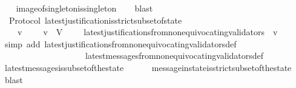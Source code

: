 \begin{isabellebody}
\ \ \isamarkupfalse%
\ image{\isacharunderscore}of{\isacharunderscore}singleton{\isacharunderscore}is{\isacharunderscore}singleton\isanewline
\ \ \isamarkupfalse%
\ blast%
\endisatagproof
{\isafoldproof}%
%
\isadelimproof
\isanewline
%
\endisadelimproof
\isanewline
{}\isamarkupfalse%
\ {\isacharparenleft}\ Protocol{\isacharparenright}\ latest{\isacharunderscore}justification{\isacharunderscore}is{\isacharunderscore}strict{\isacharunderscore}subset{\isacharunderscore}of{\isacharunderscore}state\ {\isacharcolon}\isanewline
\ \ {\isachardoublequoteopen}{\isasymforall}\ {\isasymsigma}\ v{\isachardot}\ {\isasymsigma}\ {\isasymin}\ {\isasymSigma}\ {\isasymand}\ v\ {\isasymin}\ V\ {\isasymlongrightarrow}\ {\isacharparenleft}{\isasymforall}\ {\isasymsigma}{\isacharprime}\ {\isasymin}\ latest{\isacharunderscore}justifications{\isacharunderscore}from{\isacharunderscore}non{\isacharunderscore}equivocating{\isacharunderscore}validators\ {\isasymsigma}\ v{\isachardot}\ {\isasymsigma}{\isacharprime}\ {\isasymsubset}\ {\isasymsigma}{\isacharparenright}{\isachardoublequoteclose}\isanewline
%
\isadelimproof
\ \ %
\endisadelimproof
%
\isatagproof
{}\isamarkupfalse%
\ {\isacharparenleft}simp\ add{\isacharcolon}\ latest{\isacharunderscore}justifications{\isacharunderscore}from{\isacharunderscore}non{\isacharunderscore}equivocating{\isacharunderscore}validators{\isacharunderscore}def\isanewline
\ \ \ \ \ \ \ \ \ \ \ \ \ \ \ \ \ \ \ \ latest{\isacharunderscore}messages{\isacharunderscore}from{\isacharunderscore}non{\isacharunderscore}equivocating{\isacharunderscore}validators{\isacharunderscore}def{\isacharparenright}\isanewline
\ \ \isamarkupfalse%
\ latest{\isacharunderscore}messages{\isacharunderscore}is{\isacharunderscore}subset{\isacharunderscore}of{\isacharunderscore}the{\isacharunderscore}state\isanewline
\ \ \ \ \ \ message{\isacharunderscore}in{\isacharunderscore}state{\isacharunderscore}is{\isacharunderscore}strict{\isacharunderscore}subset{\isacharunderscore}of{\isacharunderscore}the{\isacharunderscore}state\isanewline
\ \ \isamarkupfalse%
\ blast%
\endisatagproof
{\isafoldproof}%
%
\isadelimproof
\isanewline
%
\endisadelimproof
\isanewline
%
\isadelimtheory
\isanewline
%
\endisadelimtheory
%
\isatagtheory
{}\isamarkupfalse%
%
\endisatagtheory
{\isafoldtheory}%
%
\isadelimtheory
%
\endisadelimtheory
%
\end{isabellebody}%
\endinput
